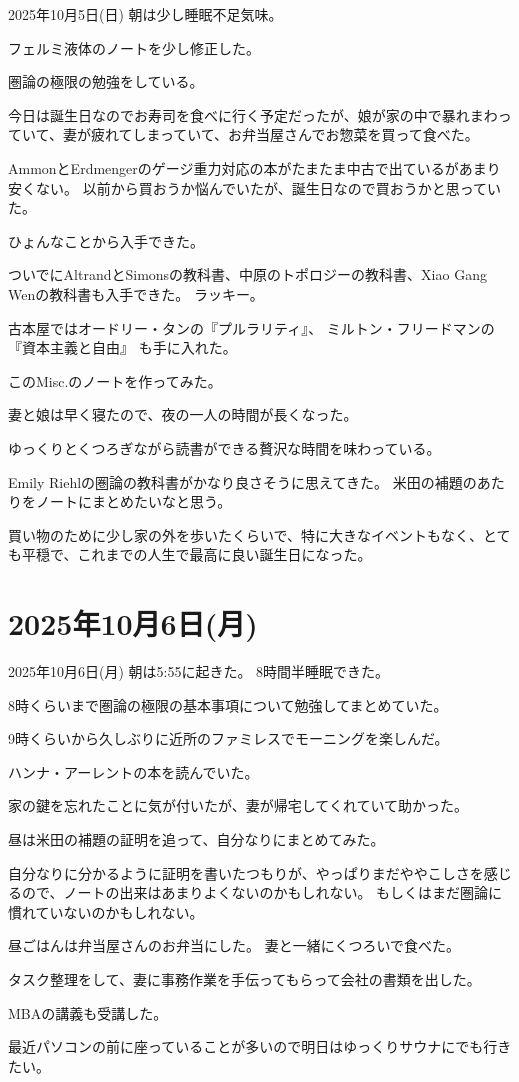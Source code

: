 \documentclass[dvipdfmx, autodetect-engine, aspectratio=169, 10.5pt]{beamer}
\begin{document}
\begin{frame}{2025年10月5日(日)}
\scriptsize
朝は少し睡眠不足気味。

フェルミ液体のノートを少し修正した。

圏論の極限の勉強をしている。

今日は誕生日なのでお寿司を食べに行く予定だったが、娘が家の中で暴れまわっていて、妻が疲れてしまっていて、お弁当屋さんでお惣菜を買って食べた。

AmmonとErdmengerのゲージ重力対応の本がたまたま中古で出ているがあまり安くない。
以前から買おうか悩んでいたが、誕生日なので買おうかと思っていた。

ひょんなことから入手できた。

ついでにAltrandとSimonsの教科書、中原のトポロジーの教科書、Xiao Gang Wenの教科書も入手できた。
ラッキー。

古本屋ではオードリー・タンの『プルラリティ』、
ミルトン・フリードマンの『資本主義と自由』
も手に入れた。

このMisc.のノートを作ってみた。

妻と娘は早く寝たので、夜の一人の時間が長くなった。

ゆっくりとくつろぎながら読書ができる贅沢な時間を味わっている。

Emily Riehlの圏論の教科書がかなり良さそうに思えてきた。
米田の補題のあたりをノートにまとめたいなと思う。

買い物のために少し家の外を歩いたくらいで、特に大きなイベントもなく、とても平穏で、これまでの人生で最高に良い誕生日になった。
\end{frame}

\section{2025年10月6日(月)}

\begin{frame}{2025年10月6日(月)}
朝は5:55に起きた。
8時間半睡眠できた。

8時くらいまで圏論の極限の基本事項について勉強してまとめていた。

9時くらいから久しぶりに近所のファミレスでモーニングを楽しんだ。

ハンナ・アーレントの本を読んでいた。

家の鍵を忘れたことに気が付いたが、妻が帰宅してくれていて助かった。

昼は米田の補題の証明を追って、自分なりにまとめてみた。

自分なりに分かるように証明を書いたつもりが、やっぱりまだややこしさを感じるので、ノートの出来はあまりよくないのかもしれない。
もしくはまだ圏論に慣れていないのかもしれない。

昼ごはんは弁当屋さんのお弁当にした。
妻と一緒にくつろいで食べた。

タスク整理をして、妻に事務作業を手伝ってもらって会社の書類を出した。

MBAの講義も受講した。

最近パソコンの前に座っていることが多いので明日はゆっくりサウナにでも行きたい。
\end{frame}
\end{document}

